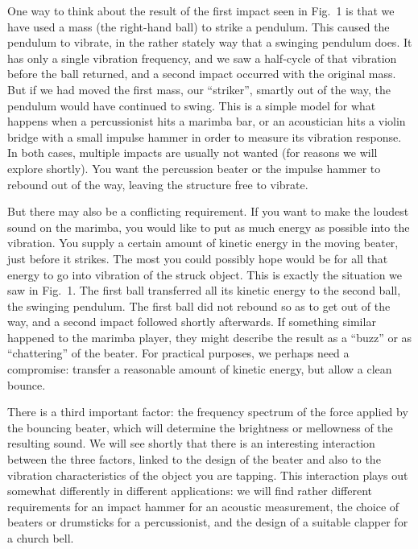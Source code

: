  One way to think about the result of the first impact seen in Fig.\ 1 is that 
  we have used a mass (the right-hand ball) to strike a pendulum. This caused 
  the pendulum to vibrate, in the rather stately way that a swinging pendulum 
  does. It has only a single vibration frequency, and we saw a half-cycle of 
  that vibration before the ball returned, and a second impact occurred with 
  the original mass. But if we had moved the first mass, our “striker”, smartly 
  out of the way, the pendulum would have continued to swing. This is a simple 
  model for what happens when a percussionist hits a marimba bar, or an 
  acoustician hits a violin bridge with a small impulse hammer in order to 
  measure its vibration response. In both cases, multiple impacts are usually 
  not wanted (for reasons we will explore shortly). You want the percussion 
  beater or the impulse hammer to rebound out of the way, leaving the structure 
  free to vibrate. 

  But there may also be a conflicting requirement. If you want to make the 
  loudest sound on the marimba, you would like to put as much energy as 
  possible into the vibration. You supply a certain amount of kinetic energy in 
  the moving beater, just before it strikes. The most you could possibly hope 
  would be for all that energy to go into vibration of the struck object. This 
  is exactly the situation we saw in Fig.\ 1. The first ball transferred all 
  its kinetic energy to the second ball, the swinging pendulum. The first ball 
  did not rebound so as to get out of the way, and a second impact followed 
  shortly afterwards. If something similar happened to the marimba player, they 
  might describe the result as a “buzz” or as “chattering” of the beater. For 
  practical purposes, we perhaps need a compromise: transfer a reasonable 
  amount of kinetic energy, but allow a clean bounce. 

  There is a third important factor: the frequency spectrum of the force 
  applied by the bouncing beater, which will determine the brightness or 
  mellowness of the resulting sound. We will see shortly that there is an 
  interesting interaction between the three factors, linked to the design of 
  the beater and also to the vibration characteristics of the object you are 
  tapping. This interaction plays out somewhat differently in different 
  applications: we will find rather different requirements for an impact hammer 
  for an acoustic measurement, the choice of beaters or drumsticks for a 
  percussionist, and the design of a suitable clapper for a church bell. 


